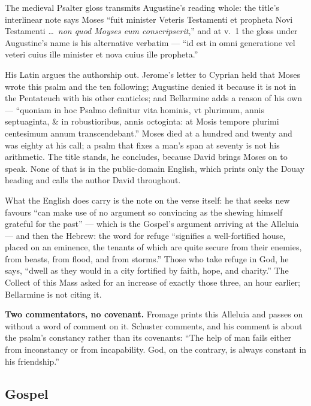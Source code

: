 The medieval Psalter gloss transmits Augustine's reading whole: the title's
interlinear note says Moses ``fuit minister Veteris Testamenti et propheta Novi
Testamenti \dots\ \emph{non quod Moyses eum conscripserit},'' and at v.~1 the
gloss under Augustine's name is his alternative verbatim --- ``id est in omni
generatione vel veteri cuius ille minister et nova cuius ille propheta.''

\begin{witnessnote}
His Latin argues the authorship out. Jerome's letter to Cyprian held that Moses
wrote this psalm and the ten following; Augustine denied it because it is not
in the Pentateuch with his other canticles; and Bellarmine adds a reason of his
own --- ``quoniam in hoc Psalmo definitur vita hominis, vt plurimum, annis
septuaginta, \& in robustioribus, annis octoginta: at Mosis tempore plurimi
centesimum annum transcendebant.'' Moses died at a hundred and twenty and was
eighty at his call; a psalm that fixes a man's span at seventy is not his
arithmetic. The title stands, he concludes, because David brings Moses on to
speak. None of that is in the public-domain English, which prints only the
Douay heading and calls the author David throughout.

What the English does carry is the note on the verse itself: he that seeks new favours ``can make use of no argument so convincing
as the shewing himself grateful for the past'' --- which is the Gospel's
argument arriving at the Alleluia --- and then the Hebrew: the word for refuge
``signifies a well-fortified house, placed on an eminence, the tenants of which
are quite secure from their enemies, from beasts, from flood, and from
storms.'' Those who take refuge in God, he says, ``dwell as they would in a
city fortified by faith, hope, and charity.'' The Collect of this Mass asked
for an increase of exactly those three, an hour earlier; Bellarmine is not
citing it.
\end{witnessnote}

\textbf{Two commentators, no covenant.} Fromage prints this Alleluia and
passes on without a word of comment on it. Schuster comments, and his comment
is about the psalm's constancy rather than its covenants: ``The help of man
fails either from inconstancy or from incapability. God, on the contrary, is
always constant in his friendship.''

\elementguard
\subsection*{Gospel }

